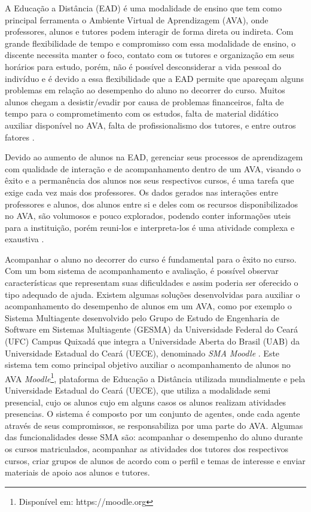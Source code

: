 \iniciocapitulo

A Educação a Distância (EAD) é uma modalidade de ensino que tem como principal ferramenta o Ambiente Virtual de Aprendizagem (AVA), onde professores, alunos e tutores podem interagir de forma direta ou indireta. Com grande flexibilidade de tempo e compromisso com essa modalidade de ensino, o discente necessita manter o foco, contato com os tutores e organização em seus horários para estudo, porém, não é possível desconsiderar a vida pessoal do indivíduo e é devido a essa flexibilidade que a EAD permite que apareçam alguns problemas em relação ao desempenho do aluno no decorrer do curso. Muitos alunos chegam a desistir/evadir por causa de problemas financeiros, falta de tempo para o comprometimento com os estudos, falta de material didático auxiliar disponível no AVA, falta de profissionalismo dos tutores, e entre outros fatores \cite{cavalcantimineraccao}.

Devido ao aumento de alunos na EAD, gerenciar seus processos de aprendizagem com qualidade de interação e de acompanhamento dentro de um AVA, visando o êxito e a permanência dos alunos nos seus respectivos cursos, é uma tarefa que exige cada vez mais dos professores. Os dados gerados nas interações entre professores e alunos, dos alunos entre si e deles com os recursos disponibilizados no AVA, são volumosos e pouco explorados, podendo conter informações uteis para a instituição, porém reuni-los e interpreta-los é uma atividade complexa e exaustiva \cite{kampff2009mineraccao}.

Acompanhar o aluno no decorrer do curso é fundamental para o êxito no curso. Com um bom sistema de acompanhamento e avaliação, é possível observar características que representam suas dificuldades e assim poderia ser oferecido o tipo adequado de ajuda. Existem algumas soluções desenvolvidas para auxiliar o acompanhamento do desempenho de alunos em um AVA, como por exemplo o Sistema Multiagente desenvolvido pelo Grupo de Estudo de Engenharia de Software em Sistemas Multiagente (GESMA) da Universidade Federal do Ceará (UFC) Campus Quixadá que integra a Universidade Aberta do Brasil (UAB) da Universidade Estadual do Ceará (UECE), denominado \textit{SMA Moodle} \cite{gonccalvesabordagem}. Este sistema tem como principal objetivo auxiliar o acompanhamento de alunos no AVA \textit{Moodle}\footnote{Disponível em: https://moodle.org}, plataforma de Educação a Distância utilizada mundialmente e pela Universidade Estadual do Ceará (UECE), que utiliza a modalidade semi presencial, cujo os alunos cujo em alguns casos os alunos realizam atividades presencias. O sistema é composto por um conjunto de agentes, onde cada agente através de seus compromissos, se responsabiliza por uma parte do AVA. Algumas das funcionalidades desse SMA são: acompanhar o desempenho do aluno durante os cursos matriculados, acompanhar as atividades dos tutores dos respectivos cursos, criar grupos de alunos de acordo com o perfil e temas de interesse e enviar materiais de apoio aos alunos e tutores.

